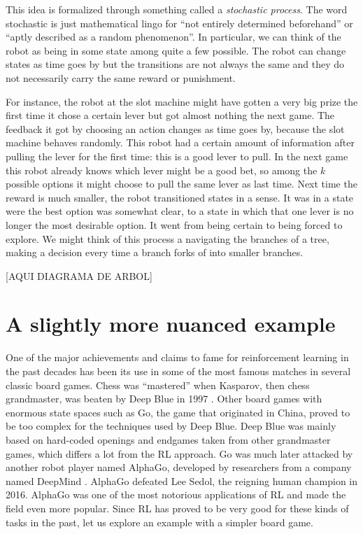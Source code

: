 This idea is formalized through something called a 
\textit{stochastic process}. The word stochastic is just 
mathematical lingo for ``not entirely determined beforehand'' 
or ``aptly described as a random phenomenon''.  In particular, 
we can think of the robot as being in some state among quite a 
few possible. The robot can change states as time goes by but 
the transitions are not always the same and they do not 
necessarily carry the same reward or punishment.

For instance, the robot at the slot machine might have gotten a 
very big prize the first time it chose a certain lever but got 
almost nothing the next game. The feedback it got by choosing 
an action changes as time goes by, because the slot machine 
behaves randomly. This robot had a certain amount of 
information after pulling the lever for the first time: this is 
a good lever to pull. In the next game this robot already knows 
which lever might be a good bet, so among the $k$ possible 
options it might choose to pull the same lever as last time. 
Next time the reward is much smaller, the robot transitioned 
states in a sense. It was in a state were the best option was 
somewhat clear, to a state in which that one lever is no longer 
the most desirable option. It went from being certain to being 
forced to explore. We might think of this process a navigating 
the branches of a tree, making a decision every time a branch 
forks of into smaller branches.

[AQUI DIAGRAMA DE ARBOL]

\section{A slightly more nuanced example}
One of the major achievements and claims to fame for 
reinforcement learning in the past decades has been its use in 
some of the most famous matches in several classic board games.  
Chess was ``mastered'' when Kasparov, then chess grandmaster, 
was beaten by Deep Blue in 1997 \cite{silverchess}. Other board 
games with enormous state spaces such as Go, the game that 
originated in China, proved to be too complex for the 
techniques used by Deep Blue. Deep Blue was mainly based on 
hard-coded openings and endgames taken from other grandmaster 
games, which differs a lot from the RL approach. Go was much 
later attacked by another robot player named AlphaGo, developed 
by researchers from a company named DeepMind 
\cite{silver2017mastering}.  AlphaGo defeated Lee Sedol, the 
reigning human champion in 2016.  AlphaGo was one of the most 
notorious applications of RL and made the field even more 
popular. Since RL has proved to be very good for these kinds of 
tasks in the past, let us explore an example with a simpler 
board game.

